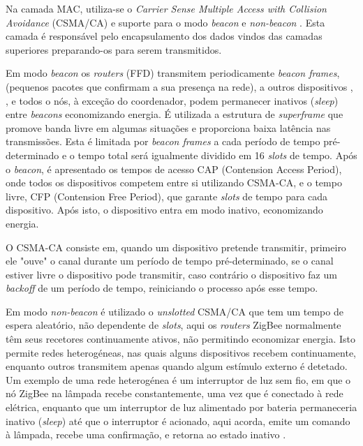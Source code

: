 \documentclass[conference]{IEEEtran}
\begin{document}
Na camada MAC, utiliza-se o \textit{Carrier Sense Multiple Access with Collision Avoidance} (CSMA/CA) e suporte para o modo \textit{beacon} e \textit{non-beacon} \cite{liang2006impact}.
Esta camada é responsável pelo encapsulamento dos dados vindos das camadas superiores preparando-os para serem transmitidos.

Em modo \textit{beacon} os \textit{routers} (FFD) transmitem periodicamente \textit{beacon frames}, (pequenos pacotes que confirmam a sua presença na rede), a outros dispositivos \cite{cirilo2014computaccao}, \cite{liang2006impact}, e todos o nós, à exceção do coordenador, podem permanecer inativos (\textit{sleep}) entre \textit{beacons} economizando energia.
É utilizada a estrutura de \textit{superframe} que promove banda livre em algumas situações e proporciona baixa latência nas transmissões.
Esta é limitada por \textit{beacon frames} a cada período de tempo pré-determinado e o tempo total será igualmente dividido em 16 \textit{slots} de tempo.
Após o \textit{beacon}, é apresentado os tempos de acesso CAP (Contension Access Period), onde todos os dispositivos competem entre si utilizando CSMA-CA, e o tempo livre, CFP (Contension Free Period), que garante \textit{slots} de tempo para cada dispositivo. 
Após isto, o dispositivo entra em modo inativo, economizando energia.

O CSMA-CA consiste em, quando um dispositivo pretende transmitir, primeiro ele "ouve" o canal durante um período de tempo pré-determinado, se o canal estiver livre o dispositivo pode transmitir, caso contrário o dispositivo faz um \textit{backoff} de um período de tempo, reiniciando o processo após esse tempo.

Em modo \textit{non-beacon} é utilizado o \textit{unslotted} CSMA/CA que tem um tempo de espera aleatório, não dependente de \textit{slots}, aqui os \textit{routers} ZigBee normalmente têm seus recetores continuamente ativos, não permitindo economizar energia.
Isto permite redes heterogéneas, nas quais alguns dispositivos recebem continuamente, enquanto outros transmitem apenas quando algum estímulo externo é detetado. 
Um exemplo de uma rede heterogénea é um interruptor de luz sem fio, em que o nó ZigBee na lâmpada recebe constantemente, uma vez que é conectado à rede elétrica, enquanto que um interruptor de luz alimentado por bateria permaneceria inativo (\textit{sleep}) até que o interruptor é acionado, aqui acorda, emite um comando à lâmpada, recebe uma confirmação, e retorna ao estado inativo \cite{zigbee_online}.
\end{document}
